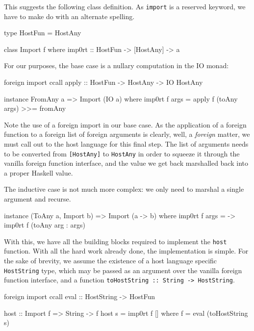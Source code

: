 \documentclass[preprint]{sigplanconf}
\begin{document}
This suggests the following class definition. As \lstinline!import! is a
reserved keyword, we have to make do with an alternate spelling.

\begin{code}
  type HostFun = HostAny

  class Import f where
    imp0rt :: HostFun -> [HostAny] -> a
\end{code}

For our purposes, the base case is a nullary computation in the IO monad:

\begin{code}
  foreign import ccall
    apply :: HostFun -> HostAny -> IO HostAny

  instance FromAny a => Import (IO a) where
    imp0rt f args =
      apply f (toAny args) >>= fromAny
\end{code}

Note the use of a foreign import in our base case. As the application of a
foreign function to a foreign list of foreign arguments is clearly, well, a
\emph{foreign} matter, we must call out to the host language for this final
step.
The list of arguments needs to be converted from \lstinline![HostAny]! to
\lstinline!HostAny! in order to squeeze it through the vanilla foreign
function interface, and the value we get back marshalled back into a proper
Haskell value.

The inductive case is not much more complex: we only need to marshal a single
argument and recurse.

\begin{code}
  instance (ToAny a, Import b) =>
           Import (a -> b) where
    imp0rt f args =
      \arg -> imp0rt f (toAny arg : args)
\end{code}

With this, we have all the building blocks required to implement the
\lstinline!host! function. With all the hard work already done, the
implementation is simple. For the sake of brevity, we assume the
existence of a host language specific \lstinline!HostString! type, which may
be passed as an argument over the vanilla foreign function interface, and a
function \lstinline!toHostString :: String -> HostString!.

\begin{code}
  foreign import ccall
    eval :: HostString -> HostFun

  host :: Import f => String -> f
  host s = imp0rt f []
    where
      f = eval (toHostString s)
\end{code}
\end{document}
